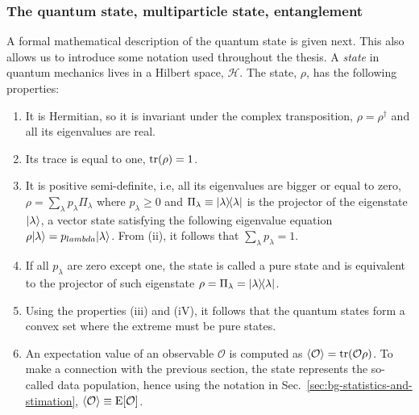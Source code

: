 \subsubsection{The quantum state, multiparticle state, entanglement}
\label{sec:bg-the-quantu-state}

A formal mathematical description of the quantum state is given next.
This also allows us to introduce some notation used throughout the thesis.
A \emph{state} in quantum mechanics lives in a Hilbert space, $\mathcal{H}$.
The state, $\rho$, has the following properties:
\begin{enumerate}
  \item
  It is Hermitian, so it is invariant under the complex transposition, $\rho=\rho^\dagger$ and all its eigenvalues are real.
  \item Its trace is equal to one, $\operatorname{tr}(\rho)=1$.
  \item It is positive semi-definite, i.e, all its eigenvalues are bigger or equal to zero, $\rho=\sum_{\lambda}p_\lambda \Pi_\lambda$ where $p_\lambda\geqslant 0$ and $\Pi_\lambda\equiv\vert{\lambda}\rangle{\!}\langle{\lambda}\vert$ is the projector of the eigenstate $\vert{\lambda}\rangle$, a vector state satisfying the following eigenvalue equation $\rho\vert{\lambda}\rangle=p_{lambda}\vert{\lambda}\rangle$.
  From (ii), it follows that $\sum_\lambda p_\lambda = 1$.
  \item If all $p_\lambda$ are zero except one, the state is called a pure state and is equivalent to the projector of such eigenstate $\rho=\Pi_\lambda=\vert{\lambda}\rangle{\!}\langle{\lambda}\vert$.
  \item Using the properties (iii) and (iV), it follows that the quantum states form a convex set where the extreme must be pure states.
  \item An expectation value of an observable $\mathcal{O}$ is computed as $\langle{\mathcal{O}}\rangle=\operatorname{tr}(\mathcal{O}\rho)$.
  To make a connection with the previous section, the state represents the so-called data population, hence using the notation in Sec.~\ref{sec:bg-statistics-and-stimation},  $\langle{\mathcal{O}}\rangle\equiv\text{E}[\mathcal{O}]$.
\end{enumerate}

